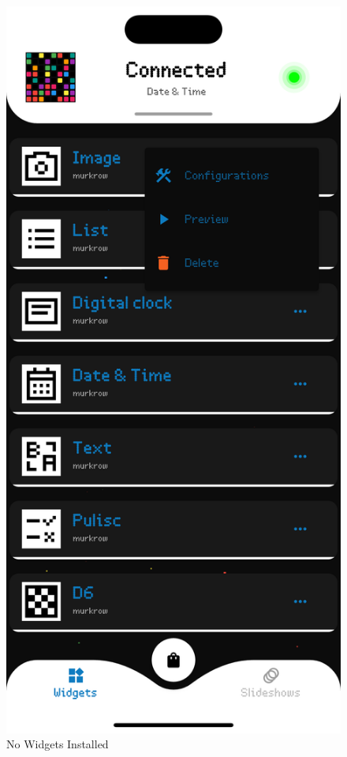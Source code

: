 \begin{figure}[h]
\begin{minipage}[b]{0.32\textwidth}
        \caption*{No Widgets Installed}
    \end{minipage}
    \begin{minipage}[b]{0.32\textwidth}
        \centering
        \includegraphics[width=\textwidth]{tesi/img/client_demo/installed_widgets/page.png}

\end{minipage}
\end{figure}
